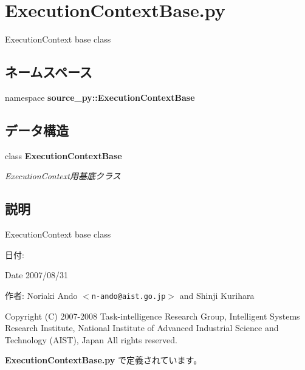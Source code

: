 \section{ExecutionContextBase.py}
\label{_execution_context_base_8py}
ExecutionContext base class 

\subsection*{ネームスペース}
\begin{CompactItemize}
\item 
namespace \textbf{source\_\-py::ExecutionContextBase}
\end{CompactItemize}
\subsection*{データ構造}
\begin{CompactItemize}
\item 
class {\bf ExecutionContextBase}
\begin{CompactList}\small\item\em ExecutionContext用基底クラス \item\end{CompactList}\end{CompactItemize}


\subsection{説明}
ExecutionContext base class 

\begin{Desc}
\item[日付:]\end{Desc}
\begin{Desc}
\item[Date]2007/08/31\end{Desc}
\begin{Desc}
\item[作者:]Noriaki Ando $<${\tt n-ando@aist.go.jp}$>$ and Shinji Kurihara\end{Desc}
Copyright (C) 2007-2008 Task-intelligence Research Group, Intelligent Systems Research Institute, National Institute of Advanced Industrial Science and Technology (AIST), Japan All rights reserved. 

 {\bf ExecutionContextBase.py} で定義されています。